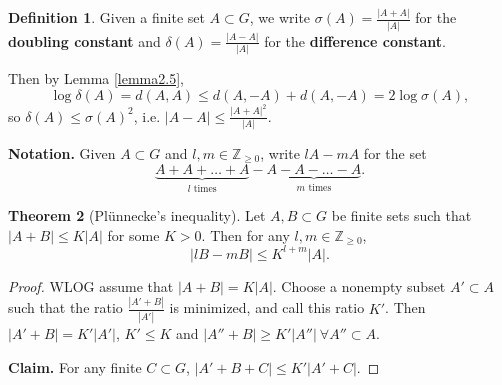 \documentclass{article}
\theoremstyle{definition}
\newtheorem{theorem}{Theorem}[section]
\newtheorem{defn}[theorem]{Definition}
\begin{document}
\begin{defn}
    Given a finite set $A \subset G$, we write $\sigma(A) = \frac{\left|A+A\right|}{\left|A\right|}$ for the \textbf{doubling constant} and $\delta(A)=\frac{\left|A-A\right|}{\left|A\right|}$ for the \textbf{difference constant}.
\end{defn}
Then by Lemma \ref{lemma2.5}, \[
\log \delta(A) = d(A,A) \le d(A,-A) + d(A,-A) = 2 \log \sigma(A),
\]
so $\delta(A) \le \sigma(A)^2$, i.e. $\left|A-A\right|\le \frac{\left|A+A\right|^2}{\left|A\right|}$.
\vspace{1mm}

\textbf{Notation.} Given $A \subset G$ and $l,m \in \mathbb{Z}_{\ge 0}$, write $lA-mA$ for the set \[
\underbrace{A + A + \ldots + A}_{l \text{ times}} - \underbrace{A - A - \ldots - A}_{m \text{ times}}.
\]
\begin{theorem}[Plünnecke's inequality]
    Let $A,B \subset G$ be finite sets such that $\left|A+B\right| \le K\left|A\right|$ for some $K>0$. Then for any $l,m \in \mathbb{Z}_{\ge 0}$,
    \[
    \left|lB-mB\right|\le K^{l+m}\left|A\right|.
    \]
\end{theorem}
\begin{proof}
    WLOG assume that $\left|A+B\right|=K\left|A\right|$. Choose a nonempty subset $A' \subset A$ such that the ratio $\frac{\left|A'+B\right|}{\left|A'\right|}$ is minimized, and call this ratio $K'$. Then $\left|A'+B\right|=K'\left|A'\right|$, $K'\le K$ and $\left|A''+B\right|\ge K'\left|A''\right| ~\forall A'' \subset A$.
    \vspace{1mm}
     
    \textbf{Claim.} For any finite $C \subset G$, $\left|A'+B+C\right|\le K'\left|A'+C\right|$.
\end{proof}
\end{document}
